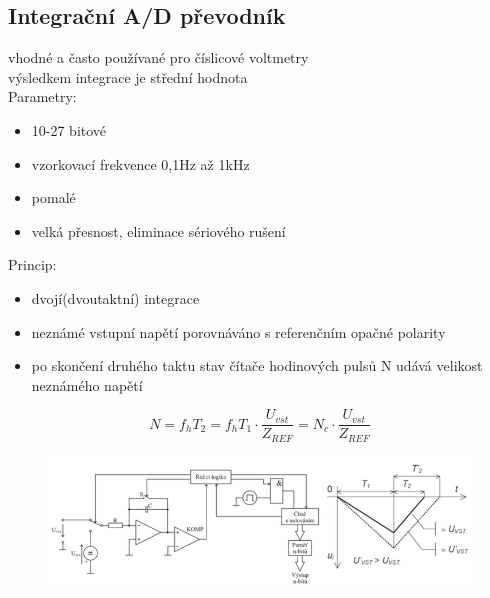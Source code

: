 \subsection*{Integrační A/D převodník}
vhodné a často používané pro číslicové voltmetry\\
výsledkem integrace je střední hodnota\\
Parametry:
\begin{itemize}
    \item 10-27 bitové
    \item vzorkovací frekvence 0,1Hz až 1kHz
    \item pomalé
    \item velká přesnost, eliminace sériového rušení
\end{itemize}
Princip:
\begin{itemize}
    \item dvojí(dvoutaktní) integrace
    \item neznámé vstupní napětí porovnáváno s referenčním opačné polarity
    \item po skončení druhého taktu stav čítače hodinových pulsů N udává velikost neznámého napětí
\end{itemize}

\begin{equation}
    N = f_hT_2 = f_hT_1\cdot \frac{U_{vst}}{Z_{REF}} = N_c \cdot \frac{U_{vst}}{Z_{REF}}
\end{equation}
\begin{figure}[H]
    \includegraphics*[scale = 1]{images/adc_integrac.png}
\end{figure}

